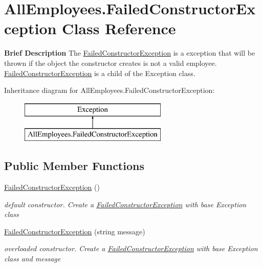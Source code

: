 \hypertarget{class_all_employees_1_1_failed_constructor_exception}{}\section{All\+Employees.\+Failed\+Constructor\+Exception Class Reference}
\label{class_all_employees_1_1_failed_constructor_exception}


{\bfseries Brief Description} The \hyperlink{class_all_employees_1_1_failed_constructor_exception}{Failed\+Constructor\+Exception} is a exception that will be thrown if the object the constructor creates is not a valid employee. \hyperlink{class_all_employees_1_1_failed_constructor_exception}{Failed\+Constructor\+Exception} is a child of the Exception class.  


Inheritance diagram for All\+Employees.\+Failed\+Constructor\+Exception\+:\begin{figure}[H]
\begin{center}
\leavevmode
\includegraphics[height=2.000000cm]{class_all_employees_1_1_failed_constructor_exception}
\end{center}
\end{figure}
\subsection*{Public Member Functions}
\begin{DoxyCompactItemize}
\item 
\hyperlink{class_all_employees_1_1_failed_constructor_exception_a78d117eff5ea056d0076b601274f382d}{Failed\+Constructor\+Exception} ()
\begin{DoxyCompactList}\small\item\em default constructor. Create a \hyperlink{class_all_employees_1_1_failed_constructor_exception}{Failed\+Constructor\+Exception} with base Exception class \end{DoxyCompactList}\item 
\hyperlink{class_all_employees_1_1_failed_constructor_exception_a41c940dd9d247e852c71b49788754e9f}{Failed\+Constructor\+Exception} (string message)
\begin{DoxyCompactList}\small\item\em overloaded constructor. Create a \hyperlink{class_all_employees_1_1_failed_constructor_exception}{Failed\+Constructor\+Exception} with base Exception class and message \end{DoxyCompactList}\end{DoxyCompactItemize}


